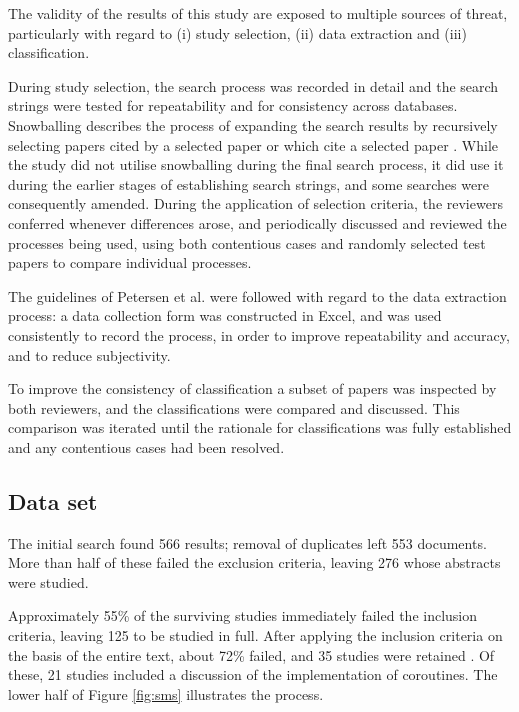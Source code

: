 The validity of the results of this study are exposed to multiple sources of threat, particularly with regard to (i) study selection, (ii) data extraction and (iii) classification.

During study selection, the search process was recorded in detail and the search strings were tested for repeatability and for consistency across databases. Snowballing describes the process of expanding the search results by recursively selecting papers cited by a selected paper or which cite a selected paper \cite{Kitchenham2011a, Petersen2015}. While the study did not utilise snowballing during the final search process, it did use it during the earlier stages of establishing search strings, and some searches were consequently amended. During the application of selection criteria, the reviewers conferred whenever differences arose, and periodically discussed and reviewed the processes being used, using both contentious cases and randomly selected test papers to compare individual processes.

The guidelines of Petersen et al. \cite{Petersen2008, Petersen2015} were followed with regard to the data extraction process: a data collection form was constructed in Excel, and was used consistently to record the process, in order to improve repeatability and accuracy, and to reduce subjectivity.

To improve the consistency of classification a subset of papers was inspected by both reviewers, and the classifications were compared and discussed. This comparison was iterated until the rationale for classifications was fully established and any contentious cases had been resolved.

\subsection{Data set}

The initial search found 566 results; removal of duplicates left 553 documents. More than half of these failed the exclusion criteria, leaving 276 whose abstracts were studied.

Approximately 55\% of the surviving studies immediately failed the inclusion criteria, leaving 125 to be studied in full. After applying the inclusion criteria on the basis of the entire text, about 72\% failed, and 35 studies were retained \cite{Alvira2013, Andalam2014, Andersen2016, Andersen2017b, Bergel2011, Boers2010, Clark2009, Cohen2007b, Durmaz2017, Elsts2017, Evers2007, Fritzsche2010, Glistvain2010, Inam2011, Jaaskelainen2008, Jahier2016, Kalebe2017, Karpin2007, Khezri2008, Kugler2013, Kumar2007, Liu2011, Lohmann2012, Motika2015, Niebert2014, Noman2017, Oldewurtel2009, Park2015, Riedel2010, Schimpf2012b, St-Amour2010, Strube2010, Susilo2009, VonHanxleden2009, Yu2008}. Of these, 21 studies included a discussion of the implementation of coroutines. The lower half of Figure \ref{fig:sms} illustrates the process.

